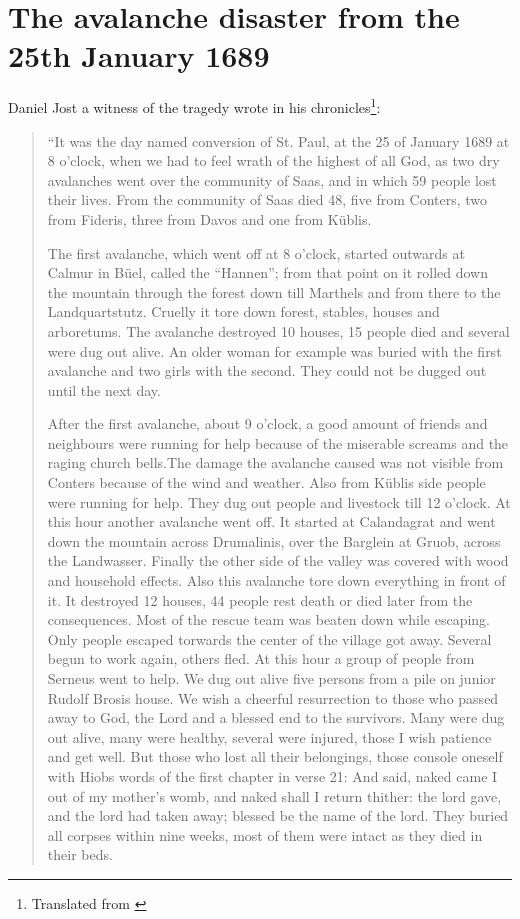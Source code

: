 \documentclass[12pt, a4paper]{article}
\begin{document}
\section*{The avalanche disaster from the 25th January 1689}
Daniel Jost a witness of the tragedy wrote in his chronicles\footnote{Translated from \citet[p.~50-51]{hansemann1995saaser}}:
\begin{quote}
\setlength{\parskip}{1.5em} 
``It was the day named  conversion of St. Paul, at the 25 of January 1689 at 8 o'clock, when we had to feel wrath of the 
highest of all God, as two dry avalanches went over the community of Saas, and in which 59 people lost their lives. 
From the community of Saas died 48, five from Conters, two from Fideris, three from Davos and one from Küblis.
 
The first avalanche, which went off at 8 o'clock, started outwards at Calmur in Büel, called the ``Hannen''; from that point 
on it rolled down the mountain through the forest down till Marthels and from there to the Landquartstutz. Cruelly it tore 
down forest, stables, houses and arboretums. The avalanche destroyed 10 houses, 15 people died and several were dug out alive.
An older woman for example was buried with the first avalanche and two girls with the second. They could not be dugged out until the next day.

After the first avalanche,  about 9 o'clock,  a good amount of friends  and neighbours were running for help because of the 
miserable screams and the raging church bells.The damage the avalanche caused was not visible from Conters because of the 
wind and weather. Also from Küblis side people were running for help. They dug out people and livestock till 12 o'clock. 
At this hour another avalanche went off. It started at Calandagrat and went down the mountain across Drumalinis, over 
the Barglein at Gruob, across the Landwasser. Finally the other side of the valley was covered with wood and household effects.
Also this avalanche tore down everything in front of it. It destroyed 12 houses, 44 people rest death or died later from the 
consequences. Most of the rescue team was beaten down while escaping. Only people escaped torwards the center of the village  got away. Several begun to work again, others fled. At this hour a group of people from Serneus went to help. 
We dug out alive five persons from a pile on junior Rudolf Brosis house. We wish a cheerful resurrection to those who passed 
away to God, the Lord and a blessed end to the survivors. Many were dug out alive, many were healthy, several were injured, 
those I wish patience and get well. But those who lost all their belongings, those console oneself with Hiobs words of the 
first chapter in verse 21: And said, naked came I out of my mother's womb, and naked shall I return thither: the lord gave, 
and the lord had taken away; blessed be the name of the lord. They buried all corpses within nine weeks, most of them were 
intact as they died in their beds. 


\end{quote}
\end{document}
